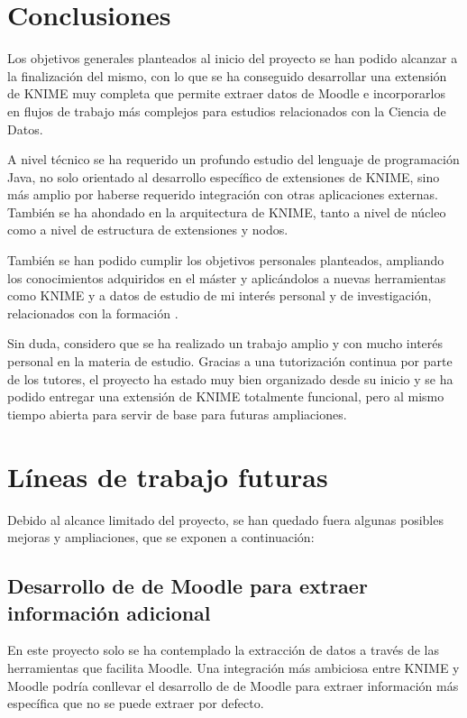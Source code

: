 

\section{Conclusiones}

Los objetivos generales planteados al inicio del proyecto se han podido alcanzar a la finalización del mismo, con 
lo que se ha conseguido desarrollar una extensión de KNIME muy completa que permite extraer datos de Moodle e
 incorporarlos en flujos de trabajo más complejos para estudios relacionados con la Ciencia de Datos. 
\ 

A nivel técnico se ha requerido un profundo estudio del lenguaje de programación Java, no solo orientado al desarrollo
específico de extensiones de KNIME, sino más amplio por haberse requerido integración con otras aplicaciones externas. 
También se ha ahondado en la arquitectura de KNIME, tanto a nivel de núcleo como a nivel de estructura de extensiones y nodos. 

También se han podido cumplir los objetivos personales planteados, ampliando los conocimientos adquiridos en el máster y 
aplicándolos a nuevas herramientas como KNIME y a datos de estudio de mi interés personal y de investigación, relacionados 
con la formación . 

Sin duda, considero que se ha realizado un trabajo amplio y con mucho interés personal en la materia de estudio. 
Gracias a una tutorización continua por parte de los tutores, el proyecto ha estado muy bien organizado desde 
su inicio y se ha podido entregar una extensión de KNIME totalmente funcional, pero al mismo tiempo abierta para servir 
de base para futuras ampliaciones. 


\section{Líneas de trabajo futuras}

Debido al alcance limitado del proyecto, se han quedado fuera algunas posibles mejoras y ampliaciones, que se exponen a continuación: 

\subsection{Desarrollo de  de Moodle para extraer información adicional}

En este proyecto solo se ha contemplado la extracción de datos a través de las herramientas que facilita Moodle. 
Una integración más ambiciosa entre KNIME y Moodle podría conllevar el desarrollo de  de Moodle para extraer información más específica que no se puede extraer por defecto. 

